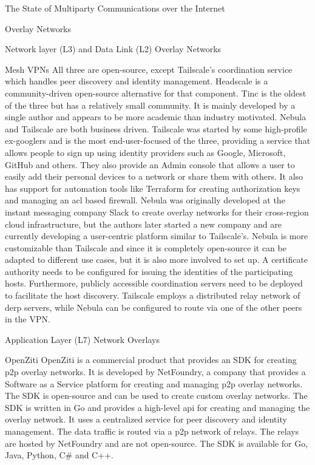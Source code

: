 \begin{frame}[fragile]{The State of Multiparty Communications over the
Internet}
\begin{block}{Overlay Networks}
\begin{block}{Network layer (L3) and Data Link (L2) Overlay Networks}
\begin{block}{Mesh VPNs}
All three are open-source, except Tailscale's coordination service which
handles peer discovery and identity management. Headscale
\autocite{fontJuanfontHeadscale2022} is a community-driven open-source
alternative for that component. Tinc is the oldest of the three but has
a relatively small community. It is mainly developed by a single author
and appears to be more academic than industry motivated. Nebula and
Tailscale are both business driven. Tailscale was started by some
high-profile ex-googlers and is the most end-user-focused of the three,
providing a service that allows people to sign up using identity
providers such as Google, Microsoft, GitHub and others. They also
provide an Admin console that allows a user to easily add their personal
devices to a network or share them with others. It also has support for
automation tools like Terraform for creating authorization keys and
managing an \gls{acl} based firewall. Nebula was originally developed at
the instant messaging company Slack to create overlay networks for their
cross-region cloud infrastructure, but the authors later started a new
company and are currently developing a user-centric platform similar to
Tailscale's. Nebula is more customizable than Tailscale and since it is
completely open-source it can be adapted to different use cases, but it
is also more involved to set up. A certificate authority needs to be
configured for issuing the identities of the participating hosts.
Furthermore, publicly accessible coordination servers need to be
deployed to facilitate the host discovery. Tailscale employs a
distributed relay network of \gls{derp} servers, while Nebula can be
configured to route via one of the other peers in the VPN.
\end{block}
\end{block}

\begin{block}{Application Layer (L7) Network Overlays}
\protect\hypertarget{application-layer-l7-network-overlays}{}
\begin{block}{OpenZiti}
\protect\hypertarget{openziti}{}
OpenZiti is a commercial product that provides an SDK for creating
\gls{p2p} overlay networks. It is developed by NetFoundry, a company
that provides a Software as a Service platform for creating and managing
\gls{p2p} overlay networks. The SDK is open-source and can be used to
create custom overlay networks. The SDK is written in Go and provides a
high-level \gls{api} for creating and managing the overlay network. It
uses a centralized service for peer discovery and identity management.
The data traffic is routed via a \gls{p2p} network of relays. The relays
are hosted by NetFoundry and are not open-source. The SDK is available
for Go, Java, Python, C\# and C++.


\end{block}
\end{block}
\end{block}
\end{frame}
